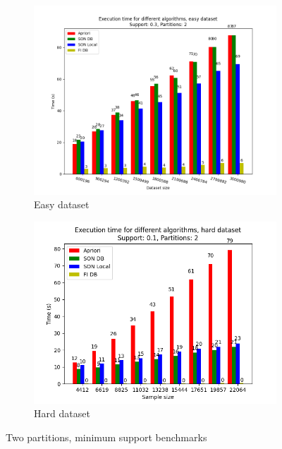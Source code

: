 \documentclass[a4paper]{article}
\begin{document}
	\begin{figure}[h]
		\centering
		\begin{subfigure}[b]{\textwidth}
			\centering
			\includegraphics[width=\textwidth]{1_easy_0,3_2_dataset.png}
         	\caption{Easy dataset}
		\end{subfigure}
		\hfill		
		\begin{subfigure}[b]{\textwidth}
			\centering
			\includegraphics[width=\textwidth]{1_hard_0,1_2_dataset.png}
         	\caption{Hard dataset}
		\end{subfigure}
		\hfill

		\caption{Two partitions, minimum support benchmarks}
		\label{fig:2par-minsup}
		
	\end{figure}
	
\end{document}
